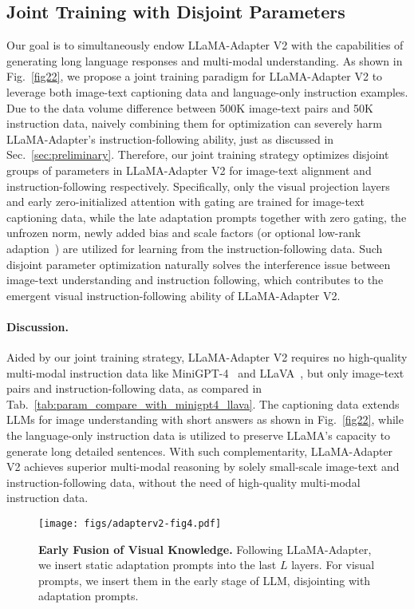 \documentclass[10pt,twocolumn,letterpaper]{article}
\begin{document}
\subsection{Joint Training with Disjoint Parameters}
\label{subsec:joint}
Our goal is to simultaneously endow LLaMA-Adapter V2 with the capabilities of generating long language responses and multi-modal understanding. As shown in Fig.~\ref{fig22}, we propose a joint training paradigm for LLaMA-Adapter V2 to leverage both image-text captioning data and language-only instruction examples.
Due to the data volume difference between 500K image-text pairs and 50K instruction data, naively combining them for optimization can severely harm LLaMA-Adapter's instruction-following ability, just as discussed in Sec.~\ref{sec:preliminary}. 
Therefore, our joint training strategy optimizes disjoint groups of parameters in LLaMA-Adapter V2 for image-text alignment and instruction-following respectively. 
Specifically, only the visual projection layers and early zero-initialized attention with gating are trained for image-text captioning data, while the late adaptation prompts together with zero gating, the unfrozen norm, newly added bias and scale factors (or optional low-rank adaption~\cite{hu2021lora}) are utilized for learning from the instruction-following data. Such disjoint parameter optimization naturally solves the interference issue between image-text understanding and instruction following, which contributes to the emergent visual instruction-following ability of LLaMA-Adapter V2.


\paragraph{Discussion.}
Aided by our joint training strategy, LLaMA-Adapter V2 requires no high-quality multi-modal instruction data like MiniGPT-4~\cite{zou2022xdecoder} and LLaVA~\cite{liu2023visual}, but only image-text pairs and instruction-following data, as compared in Tab.~\ref{tab:param_compare_with_minigpt4_llava}. The captioning data extends LLMs for image understanding with short answers as shown in Fig.~\ref{fig22}, 
while the language-only instruction data is utilized to preserve LLaMA's capacity to generate long detailed sentences. With such complementarity, LLaMA-Adapter V2 achieves superior multi-modal reasoning by solely small-scale image-text and instruction-following data, without the need of high-quality multi-modal instruction data.

\begin{figure}
    \centering
    \vspace{0.1cm}
    \texttt{[image: figs/adapterv2-fig4.pdf]}
    \caption{\textbf{Early Fusion of Visual Knowledge.} Following LLaMA-Adapter, we insert static adaptation prompts into the last $L$ layers. For visual prompts, we insert them in the early stage of LLM, disjointing with adaptation prompts.}
    \label{fig:early_fusion}
    \vspace{0.2cm}
\end{figure}
\end{document}
